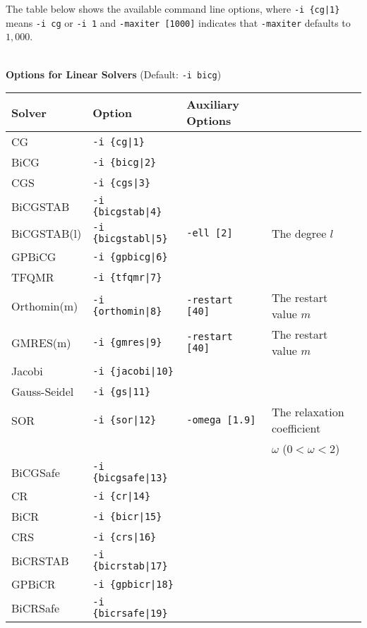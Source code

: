 \documentclass[a4paper]{article}
\begin{document}
The table below shows the available command line options, 
where \verb=-i {cg|1}= means \verb=-i cg= or \verb=-i 1= and \verb=-maxiter [1000]= indicates that \verb=-maxiter= defaults to $1,000$.
\\
\\
\begin{minipage}[t]{\textwidth}
\begin{center}
{\bf Options for Linear Solvers} (Default: \verb=-i bicg=) \\
\begin{tabular}{l|lll}\hline\hline
 Solver      & Option              &  Auxiliary Options  & \\ \hline
 CG          & \verb=-i {cg|1}=         &    \\ 
 BiCG        & \verb=-i {bicg|2}=       &    \\
 CGS         & \verb=-i {cgs|3}=        &    \\
 BiCGSTAB    & \verb=-i {bicgstab|4}=   &    \\
 BiCGSTAB(l) & \verb=-i {bicgstabl|5}=  & \verb=-ell [2]=      & The degree $l$ \\
 GPBiCG      & \verb=-i {gpbicg|6}=     &    \\
 TFQMR       & \verb=-i {tfqmr|7}=      &    \\
 Orthomin(m) & \verb=-i {orthomin|8}=   & \verb=-restart [40]= & The restart
 value $m$  \\
 GMRES(m)    & \verb=-i {gmres|9}=      & \verb=-restart [40]= & The restart value $m$  \\ 
 Jacobi      & \verb=-i {jacobi|10}=    &    \\
 Gauss-Seidel& \verb=-i {gs|11}=        &    \\
 SOR         & \verb=-i {sor|12}=       & \verb=-omega [1.9]=  & The relaxation coefficient \\
             &                          &                      & $\omega$ ($0<\omega<2$) \\
 BiCGSafe    & \verb=-i {bicgsafe|13}=     &    \\
 CR          & \verb=-i {cr|14}=        &    \\ 
 BiCR        & \verb=-i {bicr|15}=      &    \\
 CRS         & \verb=-i {crs|16}=       &    \\
 BiCRSTAB    & \verb=-i {bicrstab|17}=  &    \\
 GPBiCR      & \verb=-i {gpbicr|18}=    &    \\
 BiCRSafe    & \verb=-i {bicrsafe|19}=  &    \\

\end{tabular}
\end{center}
\end{minipage}
\end{document}
